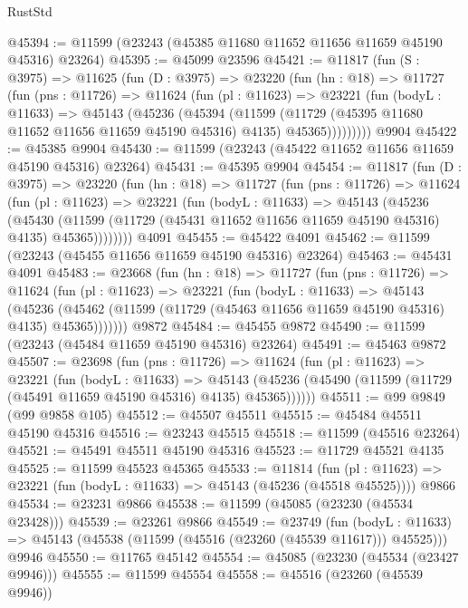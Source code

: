 \begin{lexlean}{RustStd}
\begin{coremodule}
@45394 := @11599 (@23243 (@45385 @11680 @11652 @11656 @11659 @45190 @45316) @23264)
@45395 := @45099 @23596
@45421 := @11817
    (fun (S : @3975) =>
    @11625
      (fun (D : @3975) =>
      @23220
        (fun (hn : @18) =>
        @11727
          (fun (pns : @11726) =>
          @11624
            (fun (pl : @11623) =>
            @23221
              (fun (bodyL : @11633) =>
              @45143
                (@45236
                  (@45394
                    (@11599
                      (@11729 (@45395 @11680 @11652 @11656 @11659 @45190 @45316) @4135)
                      @45365)))))))))
    @9904
@45422 := @45385 @9904
@45430 := @11599 (@23243 (@45422 @11652 @11656 @11659 @45190 @45316) @23264)
@45431 := @45395 @9904
@45454 := @11817
    (fun (D : @3975) =>
    @23220
      (fun (hn : @18) =>
      @11727
        (fun (pns : @11726) =>
        @11624
          (fun (pl : @11623) =>
          @23221
            (fun (bodyL : @11633) =>
            @45143
              (@45236
                (@45430
                  (@11599 (@11729 (@45431 @11652 @11656 @11659 @45190 @45316) @4135) @45365))))))))
    @4091
@45455 := @45422 @4091
@45462 := @11599 (@23243 (@45455 @11656 @11659 @45190 @45316) @23264)
@45463 := @45431 @4091
@45483 := @23668
    (fun (hn : @18) =>
    @11727
      (fun (pns : @11726) =>
      @11624
        (fun (pl : @11623) =>
        @23221
          (fun (bodyL : @11633) =>
          @45143
            (@45236
              (@45462 (@11599 (@11729 (@45463 @11656 @11659 @45190 @45316) @4135) @45365)))))))
    @9872
@45484 := @45455 @9872
@45490 := @11599 (@23243 (@45484 @11659 @45190 @45316) @23264)
@45491 := @45463 @9872
@45507 := @23698
    (fun (pns : @11726) =>
    @11624
      (fun (pl : @11623) =>
      @23221
        (fun (bodyL : @11633) =>
        @45143 (@45236 (@45490 (@11599 (@11729 (@45491 @11659 @45190 @45316) @4135) @45365))))))
@45511 := @99 @9849 (@99 @9858 @105)
@45512 := @45507 @45511
@45515 := @45484 @45511 @45190 @45316
@45516 := @23243 @45515
@45518 := @11599 (@45516 @23264)
@45521 := @45491 @45511 @45190 @45316
@45523 := @11729 @45521 @4135
@45525 := @11599 @45523 @45365
@45533 := @11814
    (fun (pl : @11623) => @23221 (fun (bodyL : @11633) => @45143 (@45236 (@45518 @45525))))
    @9866
@45534 := @23231 @9866
@45538 := @11599 (@45085 (@23230 (@45534 @23428)))
@45539 := @23261 @9866
@45549 := @23749
    (fun (bodyL : @11633) => @45143 (@45538 (@11599 (@45516 (@23260 (@45539 @11617))) @45525)))
    @9946
@45550 := @11765 @45142
@45554 := @45085 (@23230 (@45534 (@23427 @9946)))
@45555 := @11599 @45554
@45558 := @45516 (@23260 (@45539 @9946))

\end{coremodule}
\end{lexlean}
